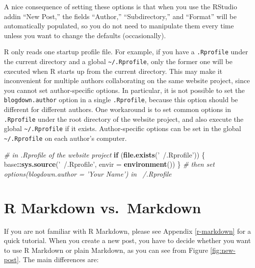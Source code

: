 \documentclass[12pt,]{krantz}
\makeatletter
\newenvironment{Shaded}{\begin{snugshade}}{\end{snugshade}}
\newcommand{\CommentTok}[1]{\textcolor[rgb]{0.56,0.35,0.01}{\textit{#1}}}
\newcommand{\ControlFlowTok}[1]{\textcolor[rgb]{0.13,0.29,0.53}{\textbf{#1}}}
\newcommand{\DataTypeTok}[1]{\textcolor[rgb]{0.13,0.29,0.53}{#1}}
\newcommand{\KeywordTok}[1]{\textcolor[rgb]{0.13,0.29,0.53}{\textbf{#1}}}
\newcommand{\NormalTok}[1]{#1}
\newcommand{\OperatorTok}[1]{\textcolor[rgb]{0.81,0.36,0.00}{\textbf{#1}}}
\newcommand{\StringTok}[1]{\textcolor[rgb]{0.31,0.60,0.02}{#1}}
\newenvironment{kframe}{%
\medskip{}
\setlength{\fboxsep}{.8em}
 \def\at@end@of@kframe{}%
 \ifinner\ifhmode%
  \def\at@end@of@kframe{\end{minipage}}%
  \begin{minipage}{\columnwidth}%
 \fi\fi%
 \def\FrameCommand##1{\hskip\@totalleftmargin \hskip-\fboxsep
 \colorbox{shadecolor}{##1}\hskip-\fboxsep
     \hskip-\linewidth \hskip-\@totalleftmargin \hskip\columnwidth}%
 \MakeFramed {\advance\hsize-\width
   \@totalleftmargin\z@ \linewidth\hsize
   \@setminipage}}%
 {\par\unskip\endMakeFramed%
 \at@end@of@kframe}
\renewenvironment{Shaded}{\begin{kframe}}{\end{kframe}}
\theoremstyle{definition}
\theoremstyle{definition}
\theoremstyle{definition}
\theoremstyle{remark}
\makeatother
\begin{document}
A nice consequence of setting these options is that when you use the
RStudio addin ``New Post,'' the fields ``Author,'' ``Subdirectory,'' and
``Format'' will be automatically populated, so you do not need to
manipulate them every time unless you want to change the defaults
(occasionally).

R only reads one startup profile file. For example, if you have a
\texttt{.Rprofile} under the current directory and a global
\texttt{\textasciitilde{}/.Rprofile}, only the former one will be
executed when R starts up from the current directory. This may make it
inconvenient for multiple authors collaborating on the same website
project, since you cannot set author-specific options. In particular, it
is not possible to set the \texttt{blogdown.author} option in a single
\texttt{.Rprofile}, because this option should be different for
different authors. One workaround is to set common options in
\texttt{.Rprofile} under the root directory of the website project, and
also execute the global \texttt{\textasciitilde{}/.Rprofile} if it
exists. Author-specific options can be set in the global
\texttt{\textasciitilde{}/.Rprofile} on each author's computer.

\begin{Shaded}
\begin{Highlighting}[]
\CommentTok{# in .Rprofile of the website project}
\ControlFlowTok{if}\NormalTok{ (}\KeywordTok{file.exists}\NormalTok{(}\StringTok{'~/.Rprofile'}\NormalTok{)) \{}
\NormalTok{  base}\OperatorTok{::}\KeywordTok{sys.source}\NormalTok{(}\StringTok{'~/.Rprofile'}\NormalTok{, }\DataTypeTok{envir =} \KeywordTok{environment}\NormalTok{())}
\NormalTok{\}}
\CommentTok{# then set options(blogdown.author = 'Your Name') in ~/.Rprofile}
\end{Highlighting}
\end{Shaded}

\hypertarget{output-format}{%
\section{R Markdown vs.~Markdown}\label{output-format}}

If you are not familiar with R Markdown, please see
Appendix \ref{r-markdown} for a quick tutorial. When you create a new
post, you have to decide whether you want to use R Markdown or plain
Markdown, as you can see from Figure \ref{fig:new-post}.
The main differences are:
\end{document}
